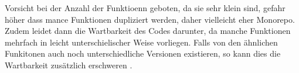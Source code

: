 \documentclass[11pt]{article}
\begin{document}



Vorsicht bei der Anzahl der Funktioenn geboten, da sie sehr klein sind, gefahr höher dass mance Funktionen dupliziert werden, daher vielleicht eher Monorepo. Zudem leidet dann die Wartbarkeit des Codes darunter, da manche Funktionen mehrfach in leicht unterschielischer Weise vorliegen. Falls von den ähnlichen Funkitonen auch noch unterschiedliche Versionen existieren, so kann dies die Wartbarkeit zusätzlich erschweren \cite{racicot2019quality}.  
\end{document}
